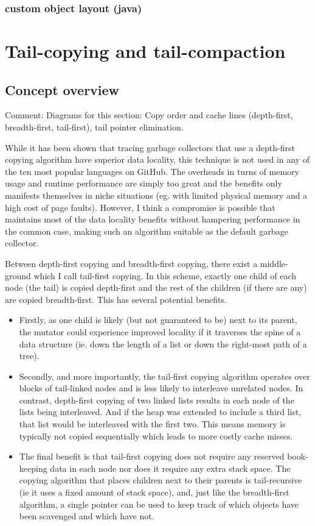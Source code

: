 \documentclass[a4paper,oneside]{memoir}
\newcommand{\makecomment}[1]{{\color{red} Comment: #1}}
\begin{document}
\subsection{custom object layout (java)}

\chapter{Tail-copying and tail-compaction}

\section{Concept overview}

\makecomment{Diagrams for this section: Copy order and cache lines (depth-first,
breadth-first, tail-first), tail pointer elimination.}

While it has been shown that tracing garbage collectors that use a depth-first
copying algorithm have superior data locality, this technique is not used in any
of the ten most popular languages on GitHub. The overheads in turns of memory
usage and runtime performance are simply too great and the benefits only
manifests themselves in niche situations (eg. with limited physical memory and
a high cost of page faults). However, I think a compromise is possible that
maintains most of the data locality benefits without hampering performance in
the common case, making such an algorithm suitable as the default garbage
collector.

Between depth-first copying and breadth-first copying, there exist a middle-ground
which I call tail-first copying. In this scheme, exactly one child of each node
(the tail) is copied depth-first and the rest of the children (if there are any)
are copied breadth-first. This has several potential benefits.
\begin{itemize}
  \item
  Firstly, as one
  child is likely (but not guaranteed to be) next to its parent, the mutator could
  experience improved locality if it traverses the spine of a data structure (ie.
  down the length of a list or down the right-most path of a tree).
  \item
  Secondly, and
  more importantly, the tail-first copying algorithm operates over blocks of
  tail-linked nodes and is less likely to interleave unrelated nodes. In contrast,
  depth-first copying of two linked lists results in each node of the lists being
  interleaved. And if the heap was extended to include a third list, that list
  would be interleaved with the first two. This means memory is typically not
  copied sequentially which leads to more costly cache misses.
  \item
  The final benefit
  is that tail-first copying does not require any reserved book-keeping data in
  each node nor does it require any extra stack space. The copying algorithm that
  places children next to their parents is tail-recursive (ie it uses a fixed
  amount of stack space), and, just like the breadth-first algorithm, a single
  pointer can be used to keep track of which objects have been scavenged and which
  have not.
\end{itemize}
\end{document}
